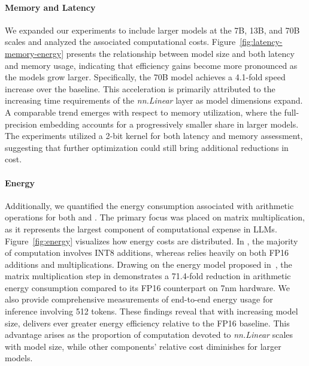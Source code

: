 \paragraph{Memory and Latency}

We expanded our experiments to include larger models at the 7B, 13B, and 70B scales and analyzed the associated computational costs. Figure~\ref{fig:latency-memory-energy} presents the relationship between model size and both latency and memory usage, indicating that efficiency gains become more pronounced as the models grow larger. Specifically, the  70B model achieves a 4.1-fold speed increase over the  baseline. This acceleration is primarily attributed to the increasing time requirements of the \emph{nn.Linear} layer as model dimensions expand. A comparable trend emerges with respect to memory utilization, where the full-precision embedding accounts for a progressively smaller share in larger models. The experiments utilized a 2-bit kernel for both latency and memory assessment, suggesting that further optimization could still bring additional reductions in cost.

\paragraph{Energy}

Additionally, we quantified the energy consumption associated with arithmetic operations for both  and . The primary focus was placed on matrix multiplication, as it represents the largest component of computational expense in LLMs. Figure~\ref{fig:energy} visualizes how energy costs are distributed. In , the majority of computation involves INT8 additions, whereas  relies heavily on both FP16 additions and multiplications. Drawing on the energy model proposed in~\cite{energycost, pokebnn}, the matrix multiplication step in  demonstrates a 71.4-fold reduction in arithmetic energy consumption compared to its FP16 counterpart on 7nm hardware. We also provide comprehensive measurements of end-to-end energy usage for inference involving 512 tokens. These findings reveal that with increasing model size,  delivers ever greater energy efficiency relative to the FP16  baseline. This advantage arises as the proportion of computation devoted to \emph{nn.Linear} scales with model size, while other components’ relative cost diminishes for larger models.

